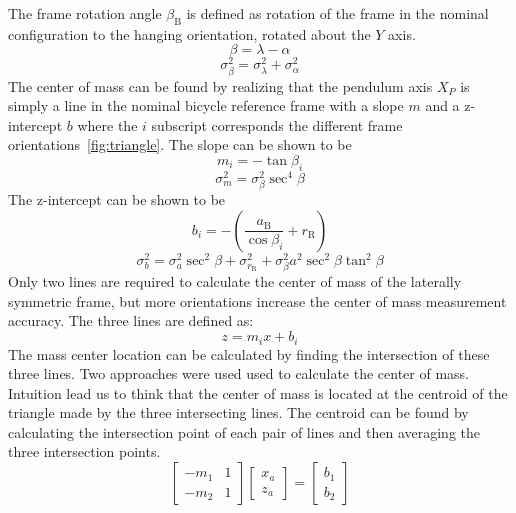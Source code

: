\documentclass{bmd2010p}
\begin{document}
The frame rotation angle $\beta_\mathrm{B}$ is defined as rotation of the frame in the
nominal configuration to the hanging orientation, rotated about the $Y$ axis.
\begin{equation}
    \beta=\lambda-\alpha
    \label{eq:frameRotAng}
\end{equation}
\begin{equation}
    \sigma_{\beta}^{2} = \sigma_{\lambda}^{2} + \sigma_{\alpha}^{2}
    \label{eq:FrameRotAngVar}
\end{equation}
The center of mass can be found by realizing that the pendulum axis $X_P$ is
simply a line in the nominal bicycle reference frame with a slope $m$ and a
z-intercept $b$ where the $i$ subscript corresponds the different frame
orientations~\ref{fig:triangle}. The slope can be shown to be
\begin{equation}
	m_i=-\tan{\beta_i}
\label{eq:slope}
\end{equation}
\begin{equation}
    \sigma_{m}^{2} = \sigma_{\beta}^{2}\sec^{4}{\beta}
    \label{eq:SlopeVar}
\end{equation}
The z-intercept can be shown to be
\begin{equation}
    b_i=-\left(\frac{a_\mathrm{B}}{\cos{\beta_i}}+r_\mathrm{R}\right)
    \label{eq:zInt}
\end{equation}
\begin{equation}
    \sigma_{b}^{2} = \sigma_{a}^{2}\sec^{2}{\beta} +
    \sigma_{r_\mathrm{R}}^{2} +
    \sigma_{\beta}^{2}a^{2}\sec^{2}{\beta}\tan^{2}{\beta}
    \label{eq:zIntvar}
\end{equation}
Only two lines are required to calculate the center of mass of the laterally
symmetric frame, but more orientations increase the center of mass measurement
accuracy. The three lines are defined as:
\begin{equation}
   z = m_ix+b_i
   \label{eq:line}
\end{equation}
The mass center location can be calculated by finding the intersection of these three
lines. Two approaches were used used to calculate the center of mass. Intuition
lead us to think that the center of mass is located at the centroid of the
triangle made by the three intersecting lines. The centroid can be found by
calculating the intersection point of each pair of lines and then averaging the
three intersection points.
\begin{equation}
	\left[
	\begin{array}{cc}
		-m_1 & 1\\
		-m_2 & 1
	\end{array}
	\right]
	\left[
	\begin{array}{c}
		x_a\\
		z_a
	\end{array}
	\right]
	=
	\left[
	\begin{array}{c}
		b_1\\
		b_2
	\end{array}
	\right]
\label{eq:linearSystem}
\end{equation}
\end{document}
